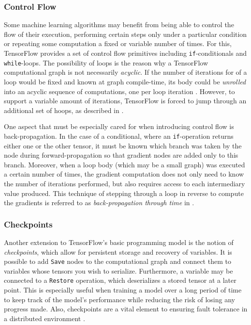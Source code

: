 \subsubsection{Control Flow}\label{sec:model-ext-flow}

Some machine learning algorithms may benefit from being able to control the flow
of their execution, performing certain steps only under a particular condition
or repeating some computation a fixed or variable number of times. For this,
TensorFlow provides a set of control flow primitives including
\texttt{if}-conditionals and \texttt{while}-loops. The possibility of loops is
the reason why a TensorFlow computational graph is not necessarily
\emph{acyclic}. If the number of iterations for of a loop would be fixed and
known at graph compile-time, its body could be \emph{unrolled} into an acyclic
sequence of computations, one per loop iteration \cite{theano}. However, to
support a variable amount of iterations, TensorFlow is forced to jump through an
additional set of hoops, as described in \cite{tensorflow}.

One aspect that must be especially cared for when introducing control flow is
back-propagation. In the case of a conditional, where an \texttt{if}-operation
returns either one or the other tensor, it must be known which branch was taken
by the node during forward-propagation so that gradient nodes are added only to
this branch. Moreover, when a loop body (which may be a small graph) was
executed a certain number of times, the gradient computation does not only need
to know the number of iterations performed, but also requires access to each
intermediary value produced. This technique of stepping through a loop in
reverse to compute the gradients is referred to as \emph{back-propagation
  through time} in \cite{theano}.

\subsubsection{Checkpoints}\label{sec:model-ext-check}

Another extension to TensorFlow's basic programming model is the notion of
\emph{checkpoints}, which allow for persistent storage and recovery of
variables. It is possible to add \texttt{Save} nodes to the computational graph
and connect them to variables whose tensors you wish to serialize. Furthermore,
a variable may be connected to a \texttt{Restore} operation, which deserializes
a stored tensor at a later point. This is especially useful when training a
model over a long period of time to keep track of the model's performance while
reducing the risk of losing any progress made. Also, checkpoints are a vital
element to ensuring fault tolerance in a distributed environment
\cite{tensorflow}.

